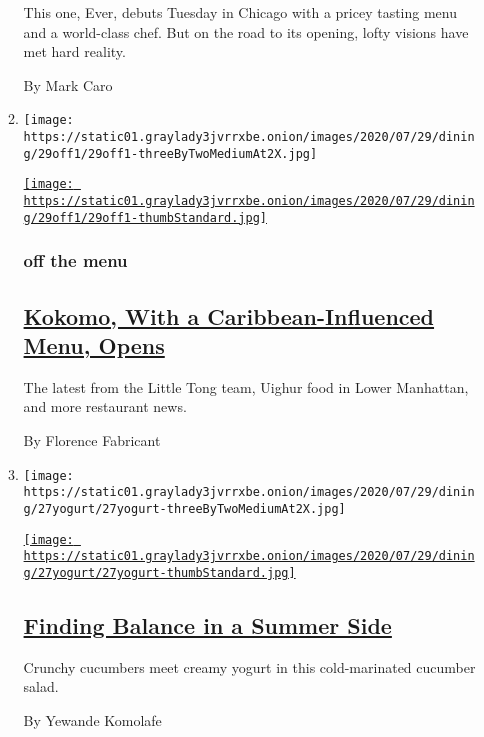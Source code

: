\begin{enumerate}
\begin{enumerate}
    This one, Ever, debuts Tuesday in Chicago with a pricey tasting menu
    and a world-class chef. But on the road to its opening, lofty
    visions have met hard reality.

    By Mark Caro
  \item
    \texttt{[image: https://static01.graylady3jvrrxbe.onion/images/2020/07/29/dining/29off1/29off1-threeByTwoMediumAt2X.jpg]}

    \href{/2020/07/28/dining/nyc-restaurant-news.html}{\texttt{[image: https://static01.graylady3jvrrxbe.onion/images/2020/07/29/dining/29off1/29off1-thumbStandard.jpg]}}

    \hypertarget{off-the-menu}{%
    \subsubsection{off the menu}\label{off-the-menu}}

    \hypertarget{kokomo-with-a-caribbean-influenced-menu-opens}{%
    \subsection{\texorpdfstring{\href{/2020/07/28/dining/nyc-restaurant-news.html}{Kokomo,
    With a Caribbean-Influenced Menu,
    Opens}}{Kokomo, With a Caribbean-Influenced Menu, Opens}}\label{kokomo-with-a-caribbean-influenced-menu-opens}}

    The latest from the Little Tong team, Uighur food in Lower
    Manhattan, and more restaurant news.

    By Florence Fabricant
  \item
    \texttt{[image: https://static01.graylady3jvrrxbe.onion/images/2020/07/29/dining/27yogurt/27yogurt-threeByTwoMediumAt2X.jpg]}

    \href{/2020/07/27/dining/cucumbers-yogurt-recipe.html}{\texttt{[image: https://static01.graylady3jvrrxbe.onion/images/2020/07/29/dining/27yogurt/27yogurt-thumbStandard.jpg]}}

    \hypertarget{finding-balance-in-a-summer-side}{%
    \subsection{\texorpdfstring{\href{/2020/07/27/dining/cucumbers-yogurt-recipe.html}{Finding
    Balance in a Summer
    Side}}{Finding Balance in a Summer Side}}\label{finding-balance-in-a-summer-side}}

    Crunchy cucumbers meet creamy yogurt in this cold-marinated cucumber
    salad.

    By Yewande Komolafe
  \end{enumerate}
\end{enumerate}

